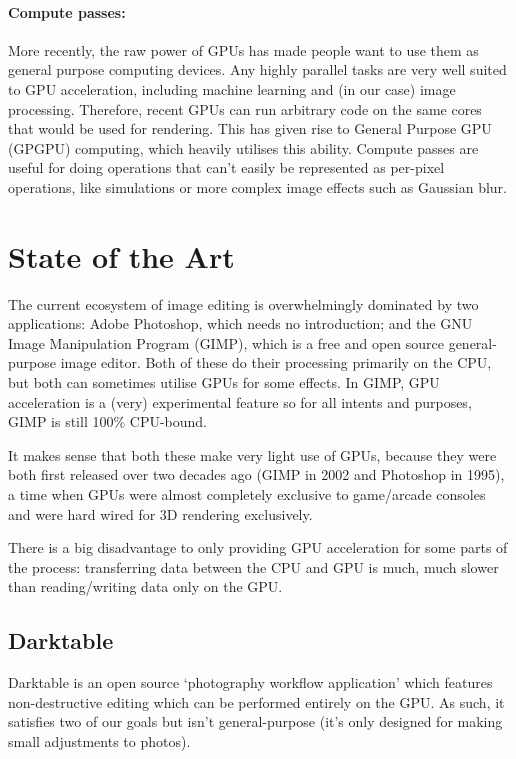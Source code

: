 \documentclass[12pt]{article}
\begin{document}
\paragraph{Compute passes:} More recently, the raw power of GPUs has made people want to use them as
general purpose computing devices.  Any highly parallel tasks are very well suited to GPU
acceleration, including machine learning and (in our case) image processing.  Therefore, recent GPUs
can run arbitrary code on the same cores that would be used for rendering.  This has given rise to
General Purpose GPU (GPGPU) computing, which heavily utilises this ability.  Compute passes are
useful for doing operations that can't easily be represented as per-pixel operations, like
simulations or more complex image effects such as Gaussian blur.



\section{State of the Art}

The current ecosystem of image editing is overwhelmingly dominated by two applications: Adobe
Photoshop, which needs no introduction; and the GNU Image Manipulation Program (GIMP), which is a
free and open source general-purpose image editor.  Both of these do their processing primarily on
the CPU, but both can sometimes utilise GPUs for some effects.  In GIMP, GPU acceleration is a
(very) experimental feature so for all intents and purposes, GIMP is still 100\% CPU-bound.

It makes sense that both these make very light use of GPUs, because they were both first released
over two decades ago (GIMP in 2002 and Photoshop in 1995), a time when GPUs were almost completely
exclusive to game/arcade consoles and were hard wired for 3D rendering exclusively.

There is a big disadvantage to only providing GPU acceleration for some parts of the process:
transferring data between the CPU and GPU is much, much slower than reading/writing data only on the
GPU.

\subsection{Darktable}

Darktable is an open source `photography workflow application' which features non-destructive
editing which can be performed entirely on the GPU.  As such, it satisfies two of our goals but
isn't general-purpose (it's only designed for making small adjustments to photos).
\end{document}
